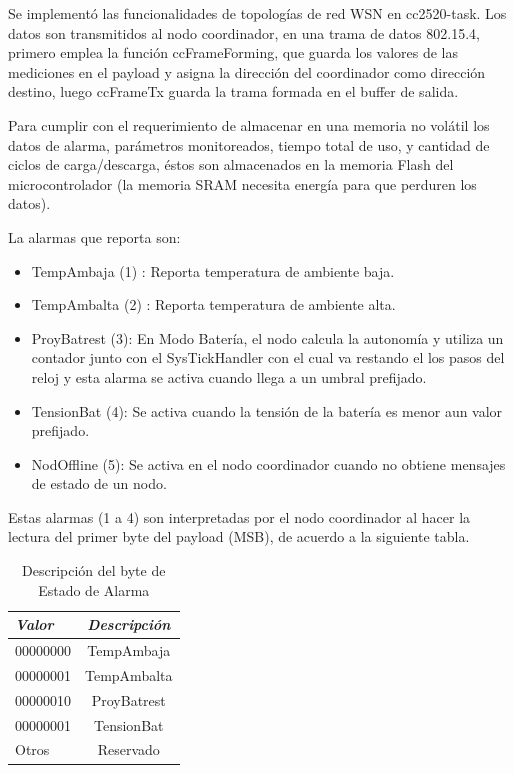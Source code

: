 {Se implementó las funcionalidades de topologías de red WSN en cc2520-task. Los datos son transmitidos al nodo coordinador, en una trama de datos 802.15.4, primero emplea la función ccFrameForming, que guarda los valores de las mediciones en el payload y asigna la dirección del coordinador como dirección destino, luego ccFrameTx guarda la trama formada en el buffer de salida.

Para cumplir con el requerimiento de almacenar en una memoria no volátil los datos de alarma, parámetros monitoreados, tiempo total de uso, y cantidad de ciclos de carga/descarga, éstos son almacenados en la memoria Flash del microcontrolador (la memoria SRAM necesita energía para que perduren los datos). 

\noindent La alarmas que reporta son:
	\begin{itemize}
	\item TempAmbaja (1) : Reporta temperatura de ambiente baja.
	\item TempAmbalta (2) : Reporta temperatura de ambiente alta.
	\item ProyBatrest (3): En Modo Batería, el nodo calcula la autonomía y utiliza un contador junto con el SysTickHandler con el cual va restando el los pasos del reloj y esta alarma se activa cuando llega a un umbral prefijado.
	\item TensionBat (4): Se activa cuando la tensión de la batería es menor aun valor prefijado.
	\item NodOffline (5): Se activa en el nodo coordinador cuando no obtiene mensajes de estado de un nodo.
	\end{itemize}
	
Estas alarmas (1 a 4) son interpretadas por el nodo coordinador al hacer la lectura del primer byte del payload (MSB), de acuerdo a la siguiente tabla. 

\begin{table}[ht]
	\centering
	\caption{Descripción del byte de Estado de Alarma}
	\begin{tabular}{@{} l *1c @{}}    \toprule
		\emph{\textbf{Valor}} & \emph{\textbf{Descripción}}\\
		\midrule
		00000000 & TempAmbaja\\	
		00000001 & TempAmbalta\\
		00000010 & ProyBatrest\\
		00000001 & TensionBat\\
		Otros & Reservado\\
		\bottomrule
		\hline
	\end{tabular}
	\label{tab:bq}
\end{table}

}
